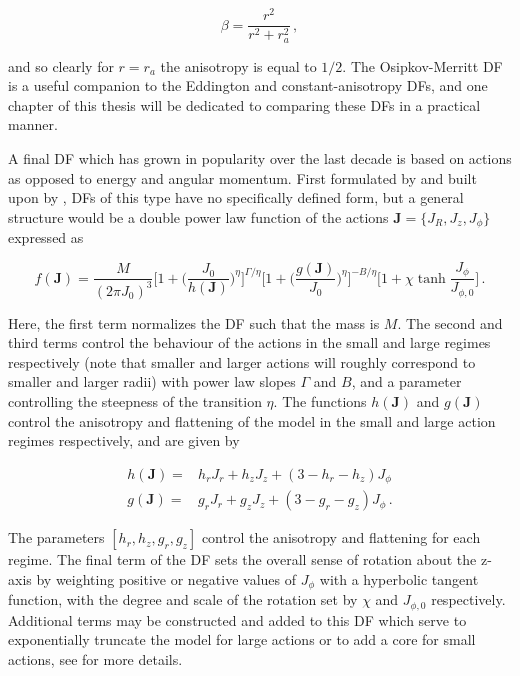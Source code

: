 \begin{equation}
    \label{ch1:eq:osipkov-merritt-anisotropy}
    \beta = \frac{r^{2}}{r^{2} + r_{a}^{2}}\,,
\end{equation}

\noindent and so clearly for $r=r_{a}$ the anisotropy is equal to $1/2$. The Osipkov-Merritt DF is a useful companion to the Eddington and constant-anisotropy DFs, and one chapter of this thesis will be dedicated to comparing these DFs in a practical manner.

A final DF which has grown in popularity over the last decade is based on actions as opposed to energy and angular momentum. First formulated by \textcite{binney14d} and built upon by \textcite{posti15}, DFs of this type have no specifically defined form, but a general structure would be a double power law function of the actions $\mathbf{J} = \{ J_{R}, J_{z}, J_{\phi} \}$ expressed as

\begin{equation}
    \label{ch1:eq:action-df}
    f(\mathbf{J}) = \frac{M}{(2\pi J_{0})^{3}} 
    \bigg[ 1 + \bigg( \frac{J_{0}}{h(\mathbf{J})} \bigg)^{\eta} \bigg]^{\Gamma/\eta} 
    \bigg[ 1 + \bigg( \frac{g(\mathbf{J})}{J_{0}} \bigg)^{\eta} \bigg]^{-B/\eta}
    \bigg[ 1 + \chi \tanh \frac{J_{\phi}}{J_{\phi,0}} \bigg]
    \,.
\end{equation}

\noindent Here, the first term normalizes the DF such that the mass is $M$. The second and third terms control the behaviour of the actions in the small and large regimes respectively (note that smaller and larger actions will roughly correspond to smaller and larger radii) with power law slopes $\Gamma$ and $B$, and a parameter controlling the steepness of the transition $\eta$. The functions $h(\mathbf{J})$ and $g(\mathbf{J})$ control the anisotropy and flattening of the model in the small and large action regimes respectively, and are given by 

\begin{equation}
\label{ch1:eq:action-df-flattening-anisotropy}
\begin{split}
    h(\mathbf{J}) = & h_{r} J_{r} + h_{z} J_{z} + (3-h_{r}-h_{z}) J_{\phi} \\
    g(\mathbf{J}) = & g_{r} J_{r} + g_{z} J_{z} + (3-g_{r}-g_{z}) J_{\phi}\,.
\end{split}
\end{equation}

\noindent The parameters $[h_{r}, h_{z}, g_{r}, g_{z}]$ control the anisotropy and flattening for each regime. The final term of the DF sets the overall sense of rotation about the z-axis by weighting positive or negative values of $J_{\phi}$ with a hyperbolic tangent function, with the degree and scale of the rotation set by $\chi$ and $J_{\phi,0}$ respectively. Additional terms may be constructed and added to this DF which serve to exponentially truncate the model for large actions or to add a core for small actions, see \textcite{binney14d} for more details.

